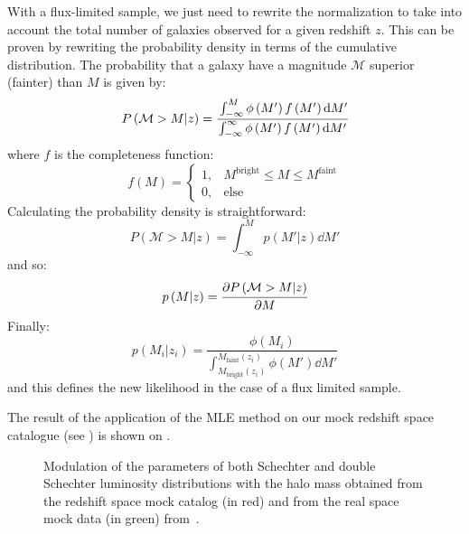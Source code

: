 With a flux-limited sample, we just need to rewrite the normalization to take
into account the total number of galaxies observed for a given redshift $z$.
This can be proven by rewriting the probability density in terms of the
cumulative distribution. The probability that a galaxy have a magnitude
$\mathcal{M}$ superior (fainter) than $M$ is given by:
%
\begin{equation}
    \label{eq:cumprobfluxlim}
    P\left(\mathcal{M}>M|z\right)=
    \cfrac{\int_{-\infty}^M \phi\left(M'\right)f\left(M'\right){\rm{d}} M'}
    {\int_{-\infty}^\infty \phi\left(M'\right)f\left(M'\right){\rm{d}} M'}
\end{equation}
%
where $f$ is the completeness function:
%
\begin{equation}
    f\left(M\right) = \begin{cases}
        1, &M^\mathrm{bright}\leq M \leq M^\mathrm{faint} \\
        0, & \mbox{else}
        \end{cases}
\end{equation}
%
Calculating the probability density is straightforward:
%
\begin{equation}
    P\left(\mathcal{M}>M|z\right)=\int_{-\infty}^M p\left(M'|z\right)\dd M'
\end{equation}
%
and so:
%
\begin{equation}
    p\left(M|z\right)=\cfrac{{\partial} P\left(\mathcal{M}>M|z\right)}{{\partial} M}
\end{equation}
%
Finally:
%
\begin{equation}
    p\left(M_i|z_i\right)=
    \dfrac{\phi\left(M_i\right)}
    {\int_{M_\mathrm{bright}\left(z_i\right)}^
        {M_\mathrm{faint}\left(z_i\right)}
        \phi\left(M'\right)\dd M'}
\end{equation}
%
and this defines the new likelihood in the case of a flux limited sample.

The result of the application of the MLE method on our mock redshift space
catalogue (see ) is shown on .
%
\begin{figure}
    \centering
    \begin{minipage}{\linewidth}
    \centering
    \end{minipage}
    \begin{minipage}{\linewidth}
    \centering
    \end{minipage}
    \caption{Modulation of the parameters of both Schechter and double
    Schechter luminosity distributions with the halo mass obtained from the
redshift space mock catalog (in red) and from the real space mock data (in
green) from~\cite{Guo+11}.\label{fig:modulation}}
\end{figure}

